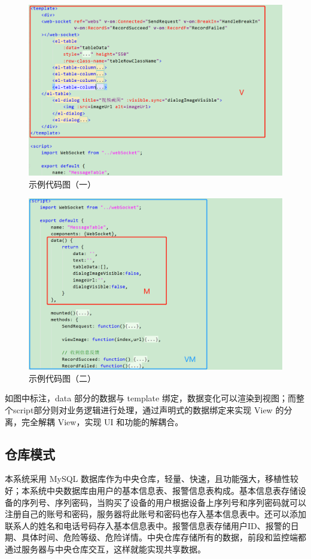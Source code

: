 \documentclass[article]{BJTU-thesis}
\begin{document}
\begin{figure}[!htbp]
	\centering
	\includegraphics[scale=.5]{img/t8.png}
	\caption{示例代码图（一）}
\end{figure}

\begin{figure}[!htbp]
	\centering
	\includegraphics[scale=.6]{img/t9.png}
	\caption{示例代码图（二）}
\end{figure}
\newpage
如图中标注，data 部分的数据与 template 绑定，数据变化可以渲染到视图；而整个script部分则对业务逻辑进行处理，通过声明式的数据绑定来实现 View 的分离，完全解耦 View，实现 UI 和功能的解耦合。

\subsection{仓库模式}
本系统采用 MySQL 数据库作为中央仓库，轻量、快速，且功能强大，移植性较好；本系统中央数据库由用户的基本信息表、报警信息表构成。基本信息表存储设备的序列号、序列密码，当购买了设备的用户根据设备上序列号和序列密码就可以注册自己的账号和密码，服务器将此账号和密码也存入基本信息表中。还可以添加联系人的姓名和电话号码存入基本信息表中。报警信息表存储用户ID、报警的日期、具体时间、危险等级、危险详情。中央仓库存储所有的数据，前段和监控端都通过服务器与中央仓库交互，这样就能实现共享数据。
\newpage
\end{document}
